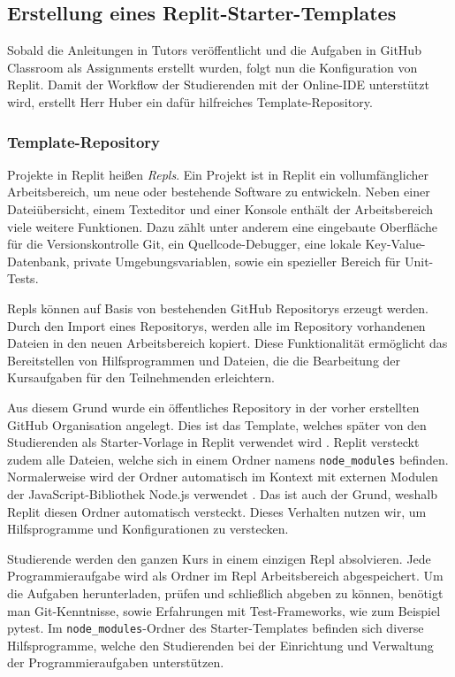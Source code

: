 \newpage

\subsection{Erstellung eines Replit-Starter-Templates}\label{replit-template}
Sobald die Anleitungen in Tutors veröffentlicht und die Aufgaben in GitHub
Classroom als Assignments erstellt wurden, folgt nun die Konfiguration von
Replit. Damit der Workflow der Studierenden mit der Online-IDE unterstützt wird,
erstellt Herr Huber ein dafür hilfreiches Template-Repository.

\subsubsection{Template-Repository}\label{replit-template-repository}
Projekte in Replit heißen \emph{Repls}. Ein Projekt ist in Replit ein
vollumfänglicher Arbeitsbereich, um neue oder bestehende Software zu entwickeln.
Neben einer Dateiübersicht, einem Texteditor und einer Konsole enthält der
Arbeitsbereich viele weitere Funktionen. Dazu zählt unter anderem eine
eingebaute Oberfläche für die Versionskontrolle Git, ein Quellcode-Debugger,
eine lokale Key-Value-Datenbank, private Umgebungsvariablen, sowie ein
spezieller Bereich für Unit-Tests.

Repls können auf Basis von bestehenden GitHub Repositorys erzeugt werden. Durch
den Import eines Repositorys, werden alle im Repository vorhandenen Dateien
in den neuen Arbeitsbereich kopiert. Diese Funktionalität ermöglicht das
Bereitstellen von Hilfsprogrammen und Dateien, die die Bearbeitung der
Kursaufgaben für den Teilnehmenden erleichtern.

Aus diesem Grund wurde ein öffentliches Repository in der vorher erstellten
GitHub Organisation angelegt. Dies ist das Template, welches später von den
Studierenden als Starter-Vorlage in Replit verwendet wird
\parencite{git-repo:replit-template}. Replit versteckt zudem alle Dateien,
welche sich in einem Ordner namens \texttt{node\_modules} befinden.
Normalerweise wird der Ordner automatisch im Kontext mit externen Modulen der 
JavaScript-Bibliothek Node.js verwendet \parencite{nodejs}. Das ist auch der
Grund, weshalb Replit diesen Ordner automatisch versteckt. Dieses Verhalten
nutzen wir, um Hilfsprogramme und Konfigurationen zu verstecken.

Studierende werden den ganzen Kurs in einem einzigen Repl absolvieren. Jede
Programmieraufgabe wird als Ordner im Repl Arbeitsbereich abgespeichert. Um die
Aufgaben herunterladen, prüfen und schließlich abgeben zu können, benötigt man
Git-Kenntnisse, sowie Erfahrungen mit Test-Frameworks, wie zum Beispiel pytest.
Im \texttt{node\_modules}-Ordner des Starter-Templates befinden sich diverse
Hilfsprogramme, welche den Studierenden bei der Einrichtung und Verwaltung der
Programmieraufgaben unterstützen.

